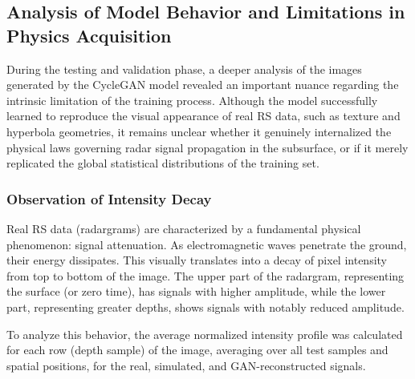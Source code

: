 \subsection{Analysis of Model Behavior and Limitations in Physics Acquisition}
\label{subsec:physics_analysis}
During the testing and validation phase, a deeper analysis of the images generated by the CycleGAN model revealed an important nuance regarding the intrinsic limitation of the training process.
Although the model successfully learned to reproduce the visual appearance of real RS data, such as texture and hyperbola geometries, it remains unclear whether it genuinely internalized the physical laws governing radar signal propagation in the subsurface, or if it merely replicated the global statistical distributions of the training set.

\subsubsection{Observation of Intensity Decay}
Real RS data (radargrams) are characterized by a fundamental physical phenomenon: signal attenuation.
As electromagnetic waves penetrate the ground, their energy dissipates.
This visually translates into a decay of pixel intensity from top to bottom of the image.
The upper part of the radargram, representing the surface (or zero time), has signals with higher amplitude, while the lower part, representing greater depths, shows signals with notably reduced amplitude.

To analyze this behavior, the average normalized intensity profile was calculated for each row (depth sample) of the image, averaging over all test samples and spatial positions, for the real, simulated, and GAN-reconstructed signals.

